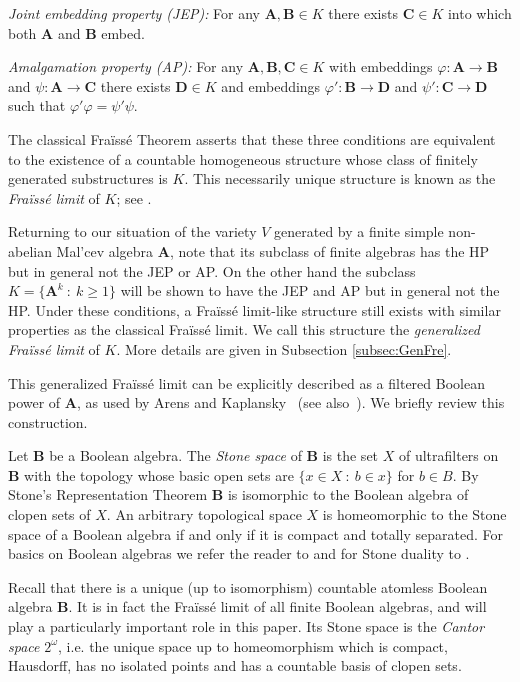 \documentclass[12pt,a4paper,reqno]{amsart}
\numberwithin{equation}{section}
\theoremstyle{plain}
\theoremstyle{definition}
\newcommand{\A}{\mathbf{A}}
\newcommand{\B}{\mathbf{B}}
\newcommand{\C}{\mathbf{C}}
\newcommand{\D}{\mathbf{D}}
\newcommand{\st}{\: :\:}
\begin{document}
\noindent
\textit{Joint embedding property (JEP):} For any $\A,\B\in K$ there exists $\C\in K$ into which both $\A$ and $\B$ embed.
\vspace{1mm}

\noindent
\textit{Amalgamation property (AP):} For any $\A,\B,\C\in K$ with embeddings $\varphi\colon\A\to\B$ and $\psi\colon \A\to\C$ there exists $\D\in K$ and 
embeddings $\varphi'\colon\B\to \D$ and $\psi'\colon\C\to\D$ such that $\varphi'\varphi=\psi'\psi$.
\vspace{1mm}

The classical Fra{\"i}ss{\'e} Theorem asserts that these three conditions are equivalent to the existence of
 a countable homogeneous structure whose class of finitely generated substructures is $K$. This necessarily unique
 structure is known as the \emph{Fra{\"i}ss{\'e} limit} of $K$; see \cite[Theorem 7.1.2]{Ho:MT}.


 Returning to our situation of the variety $V$ generated by
 a finite simple non-abelian Mal'cev algebra $\A$, note that its subclass of finite algebras
 has the HP but in general not the JEP or AP.
On the other hand the subclass $K=\{ \A^k\st k\geq 1\}$ 
will be shown to have the JEP and AP but in general not the HP.
Under these conditions,  a Fra{\"i}ss{\'e} limit-like structure still exists with similar properties as the classical
Fra{\"i}ss{\'e} limit.
We call this structure the \emph{generalized Fra{\"i}ss{\'e} limit} of $K$.
More details are given in Subsection \ref{subsec:GenFre}.

This generalized Fra{\"i}ss{\'e} limit can be explicitly described as a filtered Boolean power of $\A$,
as used by Arens and Kaplansky~\cite{AK:TRA} (see also~\cite{Ev:EAC}).
 We briefly review this construction.

Let $\B$ be a Boolean algebra. The \emph{Stone space} of $\B$ is the set $X$ of ultrafilters on $\B$
 with the topology whose basic open sets are $\{ x\in X\st b\in x\}$ for $b\in B$.
By Stone's Representation Theorem $\B$ is isomorphic to the Boolean algebra of clopen sets of $X$.
An arbitrary topological space $X$ is homeomorphic to the Stone space of a Boolean algebra if and only if it is compact and totally separated.
For basics on Boolean algebras we refer the reader to \cite[Chapter 1]{Mo:HBA1} and for Stone duality to \cite[Chapter 3]{Mo:HBA1}.



Recall that there is a unique (up to isomorphism) countable atomless Boolean algebra $\B$.
 It is in fact the  Fra{\"i}ss{\'e} limit of all finite Boolean algebras, and will play a particularly important role in this paper.
 Its Stone space is the \emph{Cantor space} $2^\omega$,
 i.e. the unique space up to homeomorphism which is compact, Hausdorff, has no isolated points and has a countable basis of clopen sets.
\end{document}
